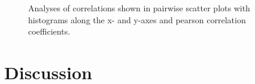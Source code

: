 \documentclass[paper=A4,bibliography=totocnumbered]{scrartcl}
\begin{document}
\begin{figure}[h!]
	\centering
	\qquad
	\qquad
	\caption{Analyses of correlations shown in pairwise scatter plots with histograms along the x- and y-axes and pearson correlation coefficients.}
	\label{fig:corr}
\end{figure}



\section{Discussion}
\end{document}
